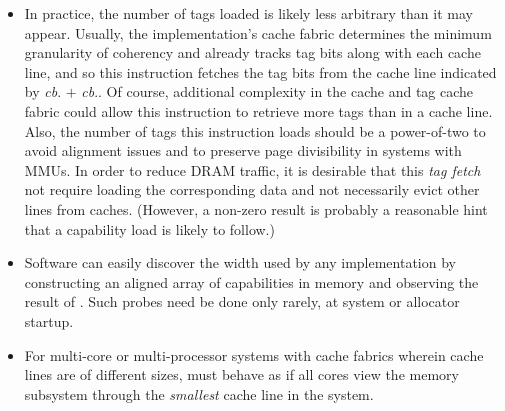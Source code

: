 \begin{itemize}
%
\item In practice, the number of tags loaded is likely less arbitrary than it
may appear. Usually, the implementation's cache fabric determines the minimum
granularity of coherency and already tracks tag bits along with each cache
line, and so this instruction fetches the tag bits from the cache line
indicated by \emph{cb}.\cbase{} $+$ \emph{cb}.\coffset{}. Of course, additional
complexity in the cache and tag cache fabric could allow this instruction to
retrieve more tags than in a cache line.
Also, the number of tags this instruction loads should be a power-of-two to
avoid alignment issues and to preserve page divisibility in systems with MMUs.
In order to reduce DRAM traffic, it is desirable that this \emph{tag fetch} not
require loading the corresponding data and not necessarily evict other lines
from caches. (However, a non-zero result is probably a reasonable hint that a
capability load is likely to follow.)


\item Software can easily discover the width used by any implementation by
constructing an aligned array of capabilities in memory and observing the
result of .
Such probes need be done only rarely, at system or allocator startup.

\item For multi-core or multi-processor systems with cache fabrics wherein cache
lines are of different sizes,  must behave as if all
cores view the memory subsystem through the \emph{smallest} cache line in
the system.

\end{itemize}
